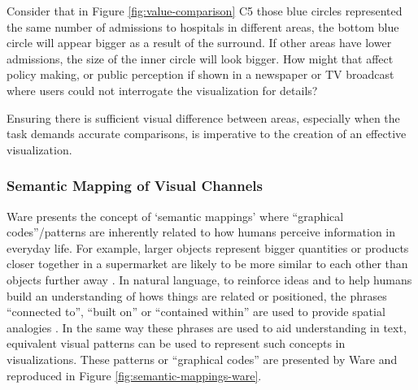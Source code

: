 Consider that in Figure \ref{fig:value-comparison} C5 those blue circles represented the same number of admissions to hospitals in different areas, the bottom blue circle will appear bigger as a result of the surround. 
If other areas have lower admissions, the size of the inner circle will look bigger.
How might that affect policy making, or public perception if shown in a newspaper or TV broadcast where users could not interrogate the visualization for details?

Ensuring there is sufficient visual difference between areas, especially when the task demands accurate comparisons, is imperative to the creation of an effective visualization. 


\subsubsection{Semantic Mapping of Visual Channels}
\label{sec:semmapping_vischan}
Ware \cite{ware2010visual} presents the concept of `semantic mappings' where ``graphical codes''/patterns are inherently related to how humans perceive information in everyday life.
For example, larger objects represent bigger quantities or products closer together in a supermarket are likely to be more similar to each other than objects further away \cite{ware2010visual}. 
In natural language, to reinforce ideas and to help humans build an understanding of hows things are related or positioned, the phrases ``connected to'', ``built on'' or ``contained within'' are used to provide spatial analogies \cite{ware2010visual}. 
In the same way these phrases are used to aid understanding in text, equivalent visual patterns can be used to represent such concepts in visualizations. 
These patterns or ``graphical codes'' are presented by Ware \cite{ware2010visual} and reproduced in Figure \ref{fig:semantic-mappings-ware}. 


